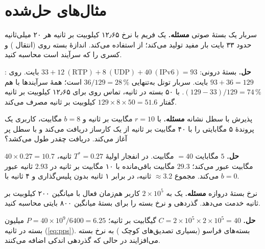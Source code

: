 \documentclass[11pt,a4paper]{article}
\begin{document}
\section{مثال‌های حل‌شده}

\begin{examplebox}{سربار یک بستهٔ صوتی}\label{ex:volte}
\textbf{مسئله.} یک فریم  با نرخ ۱۲٫۶۵ کیلوبیت بر ثانیه هر ۲۰ میلی‌ثانیه حدود ۳۳ بایت بار مفید  تولید
می‌کند؛  از  استفاده می‌کند. اندازهٔ بسته روی  (انتقال ) و کسری را که سرآیند است
محاسبه کنید.

\textbf{حل.} بستهٔ درونی: $33 + 12\ (\mathrm{RTP}) + 8\ (\mathrm{UDP}) + 40\ (\mathrm{IPv6}) = 93$ بایت. روی :
$93 + 36 = 129$ بایت. سربار تونل به‌تنهایی $36/129 = 28\,\%$ است؛ همهٔ سرآیندها با هم $(129-33)/129 = 74\,\%$. با ۵۰ بسته
در ثانیه، تماس روی  برای ۱۲٫۶۵ کیلوبیت بر ثانیه گفتار $129\times8\times50 = 51.6$ کیلوبیت بر ثانیه مصرف می‌کند.
\end{examplebox}

\begin{examplebox}{پذیرش با سطل نشانه}\label{ex:tb}
\textbf{مسئله.} با $r = 10$ مگابیت بر ثانیه و $b = 8$ مگابیت، کاربری یک پروندهٔ ۵ مگابایتی را با ۴۰ مگابیت بر ثانیه از یک
کارساز دریافت می‌کند و با سطل پر آغاز می‌کند. دریافت چقدر طول می‌کشد؟

\textbf{حل.} $5$ مگابایت $= 40$ مگابیت. در انفجار اولیهٔ $T^\ast = 0.27$ ثانیه، $40\times0.27 = 10.7$ مگابیت عبور می‌کند؛
$29.3$ مگابیت باقی‌مانده با ۱۰ مگابیت بر ثانیه در $2.93$ ثانیه عبور می‌کند. مجموع $\approx 3.2$ ثانیه، در برابر ۱ ثانیه بدون
پلیس‌گذاری و ۴ ثانیه با $b = 0$.
\end{examplebox}

\begin{examplebox}{نرخ بستهٔ دروازه}\label{ex:pps}
\textbf{مسئله.} یک  به $2\times10^5$ کاربر هم‌زمان فعال با میانگین ۲۰۰ کیلوبیت بر ثانیه خدمت می‌دهد. گذردهی و نرخ
بسته را برای بستهٔ میانگین ۸۰۰ بایتی محاسبه کنید.

\textbf{حل.} $C = 2\times10^5\times2\times10^5 = 40$ گیگابیت بر ثانیه؛ $P = 40\times10^9/6400 = 6.25$ میلیون بسته در ثانیه
(\cref{eq:pps}). بسته‌های فراسو (بسیاری تصدیق‌های کوچک ) به نرخ بسته می‌افزایند در حالی که گذردهی اندکی اضافه
می‌کنند.
\end{examplebox}

\end{document}
